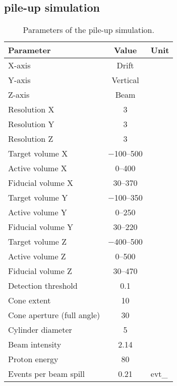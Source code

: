 \subsection{\texorpdfstring{\Pgpz}{Pi0} pile-up simulation}
\label{sec:dune-nd_pile-up_simulation}

\begin{table}[htb]
	\centering
	\caption[  pile-up simulation parameters]{%
		Parameters of the \Pgpz pile-up simulation.
	}
	\label{tab:dune-nd_pile-up-params}
	\begin{tabu} to \textwidth {lSs}
		\toprule
		Parameter &						{Value} &				{Unit} \\
		\midrule
		{X-axis} &						{Drift} &				\\
		{Y-axis} &						{Vertical} &			\\
		{Z-axis} &						{Beam} &				\\
		{Resolution X} &				3 &						\milli\metre \\
		{Resolution Y} &				3 &						\milli\metre \\
		{Resolution Z} &				3 &						\milli\metre \\
		{Target volume X} &				\numrange{-100}{500} &	\centi\metre \\
		{Active volume X} &				\numrange{0}{400} &		\centi\metre \\
		{Fiducial volume X} &			\numrange{30}{370} &	\centi\metre \\
		{Target volume Y} &				\numrange{-100}{350} &	\centi\metre \\
		{Active volume Y} &				\numrange{0}{250} &		\centi\metre \\
		{Fiducial volume Y} &			\numrange{30}{220} &	\centi\metre \\
		{Target volume Z} &				\numrange{-400}{500} &	\centi\metre \\
		{Active volume Z} &				\numrange{0}{500} &		\centi\metre \\
		{Fiducial volume Z} &			\numrange{30}{470} &	\centi\metre \\
		{Detection threshold} &			0.1 &					\mega\electronvolt \\
		{Cone extent} &					10 &				 	\radlen \\
		{Cone aperture (full angle)} &	30 &					\degree \\
		{Cylinder diameter} &			5 &						\centi\metre \\
		{Beam intensity} &				2.14 &					\mega\watt \\
		{Proton energy} &				80 &					\giga\electronvolt \\
		{Events per beam spill} &		0.21 &					evt\per\tonne_{} \\
		\bottomrule
	\end{tabu}
\end{table}

